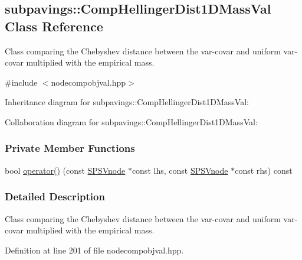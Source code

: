 \hypertarget{classsubpavings_1_1CompHellingerDist1DMassVal}{\subsection{subpavings\-:\-:\-Comp\-Hellinger\-Dist1\-D\-Mass\-Val \-Class \-Reference}
\label{classsubpavings_1_1CompHellingerDist1DMassVal}
}


\-Class comparing the \-Chebyshev distance between the var-\/covar and uniform var-\/covar multiplied with the empirical mass.  




{\ttfamily \#include $<$nodecompobjval.\-hpp$>$}



\-Inheritance diagram for subpavings\-:\-:\-Comp\-Hellinger\-Dist1\-D\-Mass\-Val\-:


\-Collaboration diagram for subpavings\-:\-:\-Comp\-Hellinger\-Dist1\-D\-Mass\-Val\-:
\subsubsection*{\-Private \-Member \-Functions}
\begin{DoxyCompactItemize}
\item 
bool \hyperlink{classsubpavings_1_1CompHellingerDist1DMassVal_abe827ab561eb3cd9d5e248bcbd84ccba}{operator()} (const \hyperlink{classsubpavings_1_1SPSVnode}{\-S\-P\-S\-Vnode} $\ast$const lhs, const \hyperlink{classsubpavings_1_1SPSVnode}{\-S\-P\-S\-Vnode} $\ast$const rhs) const 
\end{DoxyCompactItemize}


\subsubsection{\-Detailed \-Description}
\-Class comparing the \-Chebyshev distance between the var-\/covar and uniform var-\/covar multiplied with the empirical mass. 

\-Definition at line 201 of file nodecompobjval.\-hpp.



